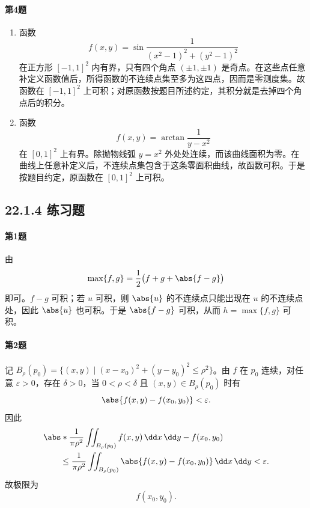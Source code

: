 \paragraph{第4题}
\begin{xsolution}
\begin{enumerate}[label=(\arabic*)]
  \item 函数
  \[
    f(x,y)=\sin\frac1{(x^2-1)^2+(y^2-1)^2}
  \]
  在正方形 $[-1,1]^2$ 内有界，只有四个角点 $(\pm1,\pm1)$ 是奇点。在这些点任意补定义函数值后，所得函数的不连续点集至多为这四点，因而是零测度集。故函数在 $[-1,1]^2$ 上可积；对原函数按题目所述约定，其积分就是去掉四个角点后的积分。

  \item 函数
  \[
    f(x,y)=\arctan\frac1{y-x^2}
  \]
  在 $[0,1]^2$ 上有界。除抛物线弧 $y=x^2$ 外处处连续，而该曲线面积为零。在曲线上任意补定义后，不连续点集包含于这条零面积曲线，故函数可积。于是按题目约定，原函数在 $[0,1]^2$ 上可积。
\end{enumerate}
\end{xsolution}

\subsection*{22.1.4 练习题}

\paragraph{第1题}
\begin{xsolution}
由
\[
  \max\{f,g\}=\frac12\bigl(f+g+\abs{f-g}\bigr)
\]
即可。$f-g$ 可积；若 $u$ 可积，则 $\abs{u}$ 的不连续点只能出现在 $u$ 的不连续点处，因此 $\abs{u}$ 也可积。于是 $\abs{f-g}$ 可积，从而 $h=\max\{f,g\}$ 可积。
\end{xsolution}

\paragraph{第2题}
\begin{xsolution}
记 $B_\rho(p_0)=\{(x,y)\mid(x-x_0)^2+(y-y_0)^2\le\rho^2\}$。由 $f$ 在 $p_0$ 连续，对任意 $\varepsilon>0$，存在 $\delta>0$，当 $0<\rho<\delta$ 且 $(x,y)\in B_\rho(p_0)$ 时有
\[
  \abs{f(x,y)-f(x_0,y_0)}<\varepsilon.
\]
因此
\begin{align*}
 &\abs*{\frac1{\pi\rho^2}\iint_{B_\rho(p_0)}f(x,y)\,\dd x\,\dd y-f(x_0,y_0)}\\
 &\qquad\le\frac1{\pi\rho^2}\iint_{B_\rho(p_0)}\abs{f(x,y)-f(x_0,y_0)}\,\dd x\,\dd y<\varepsilon.
\end{align*}
故极限为
\[
  \boxed{f(x_0,y_0)}.
\]
\end{xsolution}

